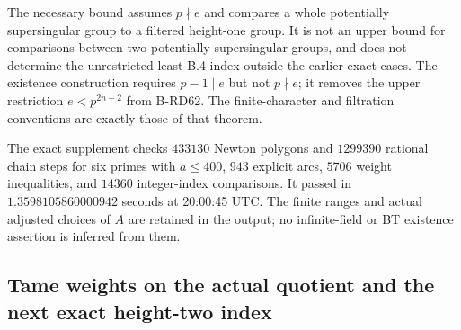 \begin{remark}
\label{rem:B-RD63-scope}
The necessary bound assumes $p\nmid e$ and compares a whole
potentially supersingular group to a filtered height-one group.
It is not an upper bound for comparisons between two potentially
supersingular groups, and does not determine the unrestricted
least B.4 index outside the earlier exact cases. The existence
construction requires $p-1\mid e$ but not $p\nmid e$; it removes
the upper restriction $e<p^{2n-2}$ from B-RD62. The finite-character
and filtration conventions are exactly those of that theorem.

The exact supplement
checks $433130$ Newton polygons and $1299390$ rational chain steps
for six primes with $a\le400$, $943$ explicit arcs, $5706$ weight
inequalities, and $14360$ integer-index comparisons. It passed in
$1.3598105860000942$ seconds at 20:00:45 UTC. The finite ranges
and actual adjusted choices of $A$ are retained in the output;
no infinite-field or BT existence assertion is inferred from them.
\end{remark}


\subsection{Tame weights on the actual quotient and the next exact height-two index}

